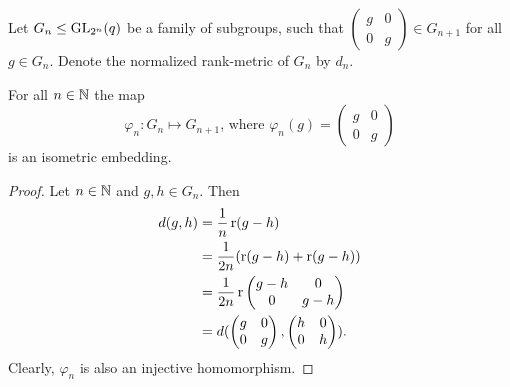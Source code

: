 Let $G_n\leq \operatorname{GL}_{2^n}(q)$ be a family of subgroups, such that 
$\begin{pmatrix}
	g & 0 \\
	0 & g 
\end{pmatrix}\in G_{n+1}$ for all $g\in G_n$. Denote the normalized rank-metric of $G_n$ by $d_n$.
\begin{lemma}
	For all $n\in \mathbb{N}$ the map
	\[\varphi_n\colon G_n\mapsto G_{n+1}\text{, where }\varphi_n(g)=\begin{pmatrix}
		g &0\\
		0&g
	\end{pmatrix}\]
	is an isometric embedding. 
\end{lemma}
\begin{proof}
	Let $n\in\mathbb{N}$ and $g,h\in G_n$. Then
	\begin{align*}
		d(g,h) & =\frac{1}{n}\operatorname{r}(g-h)               \\
		       & =\frac{1}{2n}(\operatorname{r}(g-h)+\operatorname{r}(g-h)) \\
		       & =\frac{1}{2n}\operatorname{r}                   
		\begin{pmatrix}
		g-h    & 0                                    \\
		0      & g-h                                  
		\end{pmatrix}\\
		       & =d(                                  
		\begin{pmatrix}
		g      & 0                                    \\
		0      & g                                    
		\end{pmatrix},
		\begin{pmatrix}
		h      & 0                                    \\
		0      & h                                    
		\end{pmatrix}).
	\end{align*}
	Clearly, $\varphi_n$ is also an injective homomorphism.
\end{proof}
		

